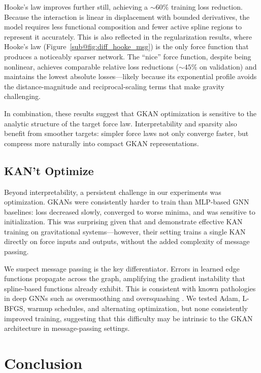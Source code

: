 \documentclass{article}
\begin{document}
Hooke's law improves further still, achieving a $\sim 60\%$ training loss reduction. Because the interaction is linear in displacement with bounded derivatives, the model requires less functional composition and fewer active spline regions to represent it accurately. This is also reflected in the regularization results, where Hooke's law (Figure~\ref{sub@fig:diff_hooke_msg}) is the only force function that produces a noticeably sparser network. The ``nice'' force function, despite being nonlinear, achieves comparable relative loss reductions ($\sim 45\%$ on validation) and maintains the lowest absolute losses---likely because its exponential profile avoids the distance-magnitude and reciprocal-scaling terms that make gravity challenging.

In combination, these results suggest that GKAN optimization is sensitive to the analytic structure of the target force law. Interpretability and sparsity also benefit from smoother targets: simpler force laws not only converge faster, but compress more naturally into compact GKAN representations.

\subsection{KAN't Optimize}

Beyond interpretability, a persistent challenge in our experiments was optimization. GKANs were consistently harder to train than MLP-based GNN baselines: loss decreased slowly, converged to worse minima, and was sensitive to initialization. This was surprising given that \cite{liu2024kankolmogorovarnoldnetworks} and \cite{liu2024kan20kolmogorovarnoldnetworks} demonstrate effective KAN training on gravitational systems---however, their setting trains a single KAN directly on force inputs and outputs, without the added complexity of message passing.

We suspect message passing is the key differentiator. Errors in learned edge functions propagate across the graph, amplifying the gradient instability that spline-based functions already exhibit. This is consistent with known pathologies in deep GNNs such as oversmoothing and oversquashing \parencite{arroyo2025vanishinggradientsoversmoothingoversquashing}. We tested Adam, L-BFGS, warmup schedules, and alternating optimization, but none consistently improved training, suggesting that this difficulty may be intrinsic to the GKAN architecture in message-passing settings.


\section{Conclusion}
\end{document}
